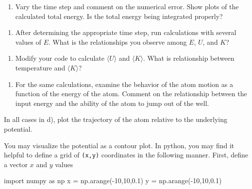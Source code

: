 \documentclass[11pt]{article}
\providecommand{\tightlist}{%
      \setlength{\itemsep}{0pt}\setlength{\parskip}{0pt}}
\newenvironment{Shaded}{}{}
\newcommand{\DecValTok}[1]{\textcolor[rgb]{0.25,0.63,0.44}{{#1}}}
\newcommand{\FloatTok}[1]{\textcolor[rgb]{0.25,0.63,0.44}{{#1}}}
\newcommand{\NormalTok}[1]{{#1}}
\newcommand{\ImportTok}[1]{{#1}}
\newcommand{\OperatorTok}[1]{\textcolor[rgb]{0.40,0.40,0.40}{{#1}}}
\begin{document}
\begin{enumerate}
\def\labelenumi{\alph{enumi})}
\tightlist
\item
  Vary the time step and comment on the numerical error. Show plots of
  the calculated total energy. Is the total energy being integrated
  properly?
\end{enumerate}

    \begin{enumerate}
\def\labelenumi{\alph{enumi})}
\setcounter{enumi}{1}
\tightlist
\item
  After determining the appropriate time step, run calculations with
  several values of \(E\). What is the relationships you observe among
  \(E\), \(U\), and \(K\)?
\end{enumerate}

    \begin{enumerate}
\def\labelenumi{\alph{enumi})}
\setcounter{enumi}{2}
\tightlist
\item
  Modify your code to calculate \(\langle U \rangle\) and
  \(\langle K \rangle\). What is relationship between temperature and
  \(\langle K \rangle\)?
\end{enumerate}

    \begin{enumerate}
\def\labelenumi{\alph{enumi})}
\setcounter{enumi}{3}
\tightlist
\item
  For the same calculations, examine the behavior of the atom motion as
  a function of the energy of the atom. Comment on the relationship
  between the input energy and the ability of the atom to jump out of
  the well.
\end{enumerate}

    In all cases in d), plot the trajectory of the atom relative to the
underlying potential.

You may visualize the potential as a contour plot. In python, you may
find it helpful to define a grid of \texttt{(x,y)} coordinates in the
following manner. First, define a vector \(x\) and \(y\) values

\begin{Shaded}
\begin{Highlighting}[]
\ImportTok{import}\NormalTok{ numpy }\ImportTok{as}\NormalTok{ np}
\NormalTok{x }\OperatorTok{=}\NormalTok{ np.arange(}\OperatorTok{{-}}\DecValTok{10}\NormalTok{,}\DecValTok{10}\NormalTok{,}\FloatTok{0.1}\NormalTok{)}
\NormalTok{y }\OperatorTok{=}\NormalTok{ np.arange(}\OperatorTok{{-}}\DecValTok{10}\NormalTok{,}\DecValTok{10}\NormalTok{,}\FloatTok{0.1}\NormalTok{)}
\end{Highlighting}
\end{Shaded}
\end{document}
